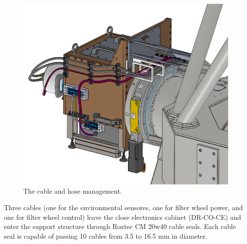 \documentclass{article}
\begin{document}
\begin{figure}
\begin{center}
\includegraphics[width=\linewidth]{newfigures/Fig9_1.png}
\end{center}
\caption{The cable and hose management.}
\label{figure:alex-cables-and-hoses}
\end{figure}

Three cables (one for the environmental sensores, one for filter wheel power, and one for filter wheel control) leave the close electronics cabinet (DR-CO-CE) and enter the support structure through Roxtec CM 20w40 cable seals. Each cable seal is capable of passing 10 cables from 3.5 to 16.5 mm in diameter.
\end{document}
